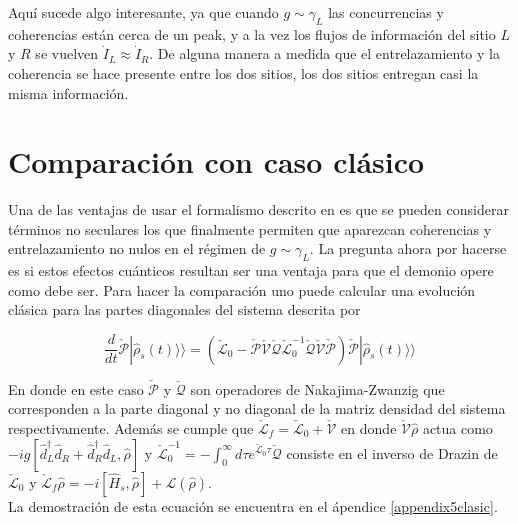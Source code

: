
Aquí sucede algo interesante, ya que cuando $g\sim \gamma_{L}$ las concurrencias y coherencias están cerca de un peak, y a la vez los flujos de información del sitio $L$ y $R$ se vuelven $\dot{I}_{L} \approx \dot{I}_{R}$. De alguna manera a medida que el entrelazamiento y la coherencia se hace presente entre los dos sitios, los dos sitios entregan casi la misma información.


\newpage 

\section{Comparación con caso clásico}
Una de las ventajas de usar el formalismo descrito en \cite{prech2023entanglement} es que se pueden considerar términos no seculares los que finalmente permiten que aparezcan coherencias y entrelazamiento no nulos en el régimen de $g\sim \gamma_{L}$. La pregunta ahora por hacerse es si estos efectos cuánticos resultan ser una ventaja para que el demonio opere como debe ser. Para hacer la comparación uno puede calcular una evolución clásica para las partes diagonales del sistema descrita por

\begin{equation}
    \frac{d}{dt}\check{\mathcal{P}}|\hat{\rho}_{s}(t)\rangle \rangle = (\check{\mathcal{L}}_{0} - \check{\mathcal{P}}\check{\mathcal{V}}\check{\mathcal{Q}}\check{\mathcal{L}}^{-1}_{0}\check{\mathcal{Q}}\check{\mathcal{V}}\check{\mathcal{P}})\check{\mathcal{P}}|\hat{\rho}_{s}(t)\rangle \rangle 
\label{ec5:classicalmodel}
\end{equation}

En donde en este caso $\check{\mathcal{P}}$ y $\check{\mathcal{Q}}$ son operadores de Nakajima-Zwanzig que corresponden a la parte diagonal y no diagonal de la matriz densidad del sistema respectivamente. Además se cumple que $\check{\mathcal{L}}_{f} = \check{\mathcal{L}}_{0} + \check{\mathcal{V}} $ en donde $\check{\mathcal{V}}\hat{\rho}$ actua como $-ig[\hat{d}_{L}^{\dagger}\hat{d}_{R} + \hat{d}_{R}^{\dagger}\hat{d}_{L},\hat{\rho}]$ y $\check{\mathcal{L}}_{0}^{-1} = - \int_{0}^{\infty}d\tau e^{\check{\mathcal{L}}_{0} \tau} \check{\mathcal{Q}} $ consiste en el inverso de Drazin de $\check{\mathcal{L}}_{0}$ \cite{landi2024current} y $\check{\mathcal{L}}_{f}\hat{\rho} = -i[\hat{H}_{s},\hat{\rho}] + \mathcal{L}(\hat{\rho})$.\\
 La demostración de esta ecuación se encuentra en el ápendice \ref{appendix5clasic}. 



